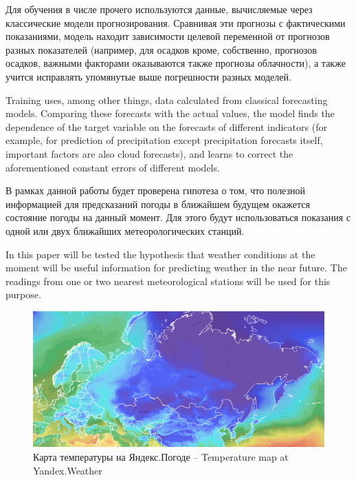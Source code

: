 \documentclass[14pt]{matmex-diploma}
\begin{document}
Для обучения в числе прочего используются данные, вычисляемые через классические модели прогнозирования. Сравнивая эти прогнозы с фактическими показаниями, модель находит зависимости целевой переменной от прогнозов разных показателей (например, для осадков кроме, собственно, прогнозов осадков, важными факторами оказываются также прогнозы облачности), а также учится исправлять упомянутые выше погрешности разных моделей.

Training uses, among other things, data calculated from classical forecasting models. Comparing these forecasts with the actual values, the model finds the dependence of the target variable on the forecasts of different indicators (for example, for prediction of precipitation except precipitation forecasts itself, important factors are also cloud forecasts), and learns to correct the aforementioned constant errors of different models.

В рамках данной работы будет проверена гипотеза о том, что полезной информацией для предсказаний погоды в ближайшем будущем окажется состояние погоды на данный момент. Для этого будут использоваться показания с одной или двух ближайших метеорологических станций.

In this paper will be tested the hypothesis that weather conditions at the moment will be useful information for predicting weather in the near future. The readings from one or two nearest meteorological stations will be used for this purpose.


\begin{figure}
\centering
\includegraphics[width=\linewidth]{images/map_coursework.png}
\caption{Карта температуры на Яндекс.Погоде -- Temperature map at Yandex.Weather}
\label{fig:map}
\end{figure}



\end{document}
